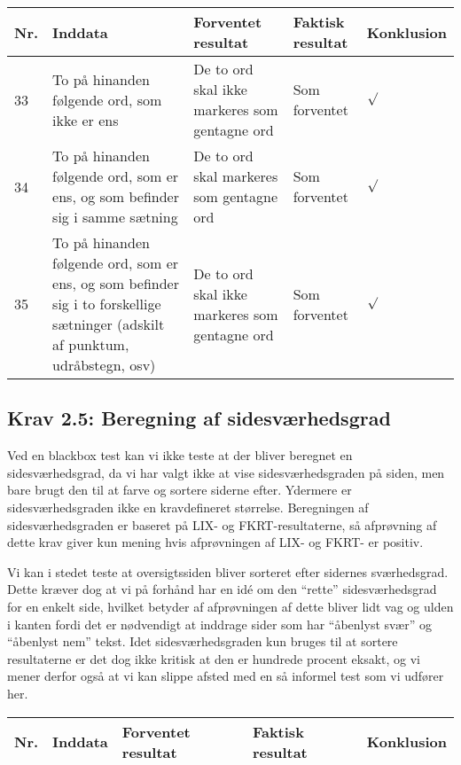 \documentclass[a4paper,oneside,article]{memoir}
\begin{document}
\begin{landscape}
\begin{longtable}[c]{p{20pt}|p{220pt}|p{130pt}|p{130pt}|p{50pt}}
\textbf{Nr.} &
\textbf{Inddata} &
\textbf{Forventet resultat} &
\textbf{Faktisk resultat} &
\textbf{Konklusion} \\ \hline

33 &
To på hinanden følgende ord, som ikke er ens &
De to ord skal ikke markeres som gentagne ord &
Som forventet &
$\surd$ \\ \hline

34 &
To på hinanden følgende ord, som er ens, og som befinder sig i samme
sætning &
De to ord skal markeres som gentagne ord &
Som forventet &
$\surd$ \\ \hline

35 &
To på hinanden følgende ord, som er ens, og som befinder sig i
to forskellige sætninger (adskilt af punktum, udråbstegn, osv) &
De to ord skal ikke markeres som gentagne ord &
Som forventet &
$\surd$ \\ \hline

\end{longtable}

\subsection{Krav 2.5: Beregning af sidesværhedsgrad}
Ved en blackbox test kan vi ikke teste at der bliver beregnet en
sidesværhedsgrad, da vi har valgt ikke at vise sidesværhedsgraden på
siden, men bare brugt den til at farve og sortere siderne
efter. Ydermere er sidesværhedsgraden ikke en kravdefineret
størrelse. Beregningen af sidesværhedsgraden er baseret på LIX- og
FKRT-resultaterne, så afprøvning af dette krav giver kun mening hvis
afprøvningen af LIX- og FKRT- er positiv.

Vi kan i stedet teste at oversigtssiden bliver sorteret efter sidernes
sværhedsgrad. Dette kræver dog at vi på forhånd har en idé om den
``rette'' sidesværhedsgrad for en enkelt side, hvilket betyder af
afprøvningen af dette bliver lidt vag og ulden i kanten fordi det er
nødvendigt at inddrage sider som har ``åbenlyst svær'' og ``åbenlyst
nem'' tekst. Idet sidesværhedsgraden kun bruges til at sortere
resultaterne er det dog ikke kritisk at den er hundrede procent
eksakt, og vi mener derfor også at vi kan slippe afsted med en så
informel test som vi udfører her.

\begin{longtable}[c]{p{20pt}|p{220pt}|p{130pt}|p{130pt}|p{50pt}}
\textbf{Nr.} &
\textbf{Inddata} &
\textbf{Forventet resultat} &
\textbf{Faktisk resultat} &
\textbf{Konklusion} \\ \hline


\end{longtable}
\end{landscape}
\end{document}
